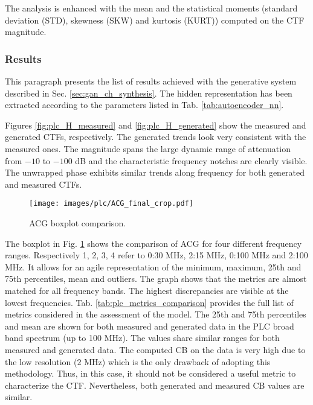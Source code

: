 The analysis is enhanced with the mean and the statistical moments (standard deviation (STD), skewness (SKW) and kurtosis (KURT)) computed on the CTF magnitude.

\subsubsection{Results}
This paragraph presents the list of results achieved with the generative system described in Sec. \ref{sec:gan_ch_synthesis}. 
The hidden representation has been extracted according to the parameters listed in Tab. \ref{tab:autoencoder_nn}. 

Figures \ref{fig:plc_H_measured} and \ref{fig:plc_H_generated} show the measured and generated CTFs, respectively. The generated trends look very consistent with the measured ones. The magnitude spans the large dynamic range of attenuation from $-10$ to $-100$ dB and the characteristic frequency notches are clearly visible. The unwrapped phase exhibits similar trends along frequency for both generated and measured CTFs. 

\begin{figure}[t]
	\centering
	\texttt{[image: images/plc/ACG\_final\_crop.pdf]}
	\caption{ACG boxplot comparison.}
	\label{fig:plc_acg}
\end{figure}

The boxplot in Fig. \ref{fig:plc_acg} shows the comparison of ACG for four different frequency ranges. Respectively 1, 2, 3, 4 refer to 0:30 MHz, 2:15 MHz, 0:100 MHz and 2:100 MHz. It allows for an agile representation of the minimum, maximum, 25th and 75th percentiles, mean and outliers. The graph shows that the metrics are almost matched for all frequency bands. The highest discrepancies are visible at the lowest frequencies.
Tab. \ref{tab:plc_metrics_comparison} provides the full list of metrics considered in the assessment of the model. The 25th and 75th percentiles and mean are shown for both measured and generated data in the PLC broad band spectrum (up to 100 MHz). The values share similar ranges for both measured and generated data. The computed CB on the data is very high due to the low resolution ($2$ MHz) which is the only drawback of adopting this methodology. Thus, in this case, it should not be considered a useful metric to characterize the CTF. Nevertheless, both generated and measured CB values are similar. 

